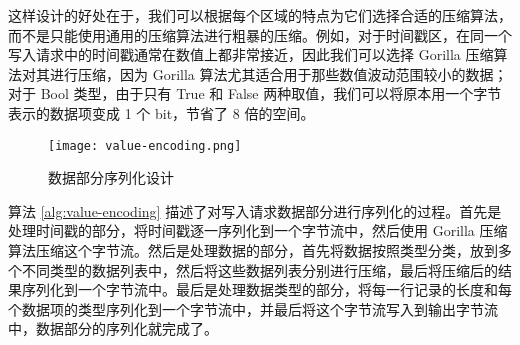 这样设计的好处在于，我们可以根据每个区域的特点为它们选择合适的压缩算法，而不是只能使用通用的压缩算法进行粗暴的压缩。例如，对于时间戳区，在同一个写入请求中的时间戳通常在数值上都非常接近，因此我们可以选择 Gorilla\cite{pelkonen2015gorilla} 压缩算法对其进行压缩，因为 Gorilla 算法尤其适合用于那些数值波动范围较小的数据；对于 Bool 类型，由于只有 True 和 False 两种取值，我们可以将原本用一个字节表示的数据项变成 1 个 bit，节省了 8 倍的空间。

\begin{figure}
  \centering
  \texttt{[image: value-encoding.png]}
  \caption{数据部分序列化设计}
  \label{fig:value-encoding-general}
\end{figure}

算法 \ref{alg:value-encoding} 描述了对写入请求数据部分进行序列化的过程。首先是处理时间戳的部分，将时间戳逐一序列化到一个字节流中，然后使用 Gorilla 压缩算法压缩这个字节流。然后是处理数据的部分，首先将数据按照类型分类，放到多个不同类型的数据列表中，然后将这些数据列表分别进行压缩，最后将压缩后的结果序列化到一个字节流中。最后是处理数据类型的部分，将每一行记录的长度和每个数据项的类型序列化到一个字节流中，并最后将这个字节流写入到输出字节流中，数据部分的序列化就完成了。

